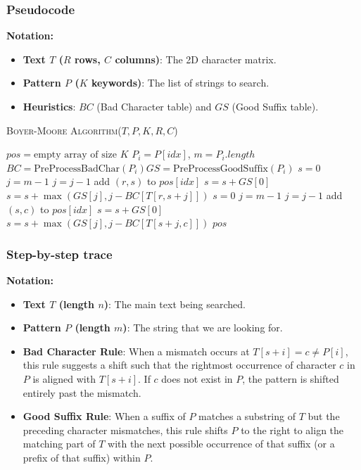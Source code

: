 \subsubsection{Pseudocode}
\textbf{Notation:}
\begin{itemize}
    \item \textbf{Text $T$ ($R$ rows, $C$ columns)}: The 2D character matrix.
    \item \textbf{Pattern $P$ ($K$ keywords)}: The list of strings to search.
    \item \textbf{Heuristics}: $BC$ (Bad Character table) and $GS$ (Good Suffix table).
\end{itemize}\textsc{Boyer-Moore Algorithm}($T, P, K, R, C$)
\begin{algorithmic}[1]
    \State $pos = \text{empty array of size } K$
    \State $P_i = P[idx]$, $m = P_i.length$
    \State $BC = \text{PreProcessBadChar}(P_i)$\State $GS = 
    \text{PreProcessGoodSuffix}(P_i)$
    \Statex
    \State $s = 0$
    \State $j = m - 1$
    \State $j = j - 1$
    \EndWhile
    \State add $(r, s)$ to $pos[idx]$
    \State $s = s + GS[0]$
    \Else
    \State $s = s + \max(GS[j], j - BC[T[r, s+j]])$
    \EndIf
    \EndWhile
    \EndFor
    \Statex
    \State $s = 0$
    \State $j = m - 1$
    \State $j = j - 1$
    \EndWhile
    \State add $(s, c)$ to $pos[idx]$
    \State $s = s + GS[0]$
    \Else
    \State $s = s + \max(GS[j], j - BC[T[s+j, c]])$
    \EndIf
    \EndWhile
    \EndFor
    \EndFor
    \State 
    \Return $pos$
\end{algorithmic}
\subsubsection{Step-by-step trace}

    \indent \textbf{Notation:}
        \begin{itemize}
            \item \textbf{Text $T$ (length $n$)}: The main text being searched.
            \item \textbf{Pattern $P$ (length $m$)}: The string that we are looking for.
            \item \textbf{Bad Character Rule}: When a mismatch occurs at $T[s+i] = c \neq P[i]$, this rule suggests a shift such that the rightmost occurrence of character $c$ in $P$ is aligned with $T[s+i]$. If $c$ does not exist in $P$, the pattern is shifted entirely past the mismatch.
            \item \textbf{Good Suffix Rule}: When a suffix of $P$ matches a substring of $T$ but the preceding character mismatches, this rule shifts $P$ to the right to align the matching part of $T$ with the next possible occurrence of that suffix (or a prefix of that suffix) within $P$.
        \end{itemize}

